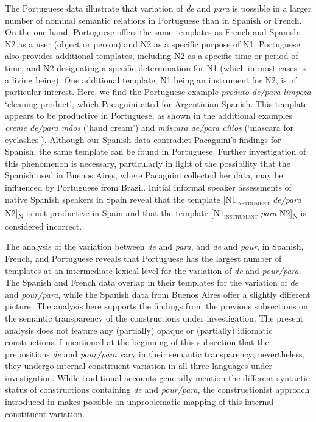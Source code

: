 \documentclass[output=paper]{langsci/langscibook}
\begin{document}
The Portuguese data illustrate that variation of \textit{de} and \textit{para} is possible in a larger number of nominal semantic relations in Portuguese than in Spanish or French. On the one hand, Portuguese offers the same templates as French and Spanish: N2 as a user (object or person) and N2 as a specific purpose of N1. Portuguese also provides additional templates, including N2 as a specific time or period of time, and N2 designating a specific determination for N1 (which in most cases is a living being). One additional template, N1 being an instrument for N2, is of particular interest. Here, we find the Portuguese example \textit{produto de/para limpeza} `cleaning product', which Pacagnini cited for Argentinian Spanish. This template appears to be productive in Portuguese, as shown in the additional examples \textit{creme de/para mãos} (`hand cream') and \textit{máscara de\slash para cílios} (`mascara for eyelashes'). Although our Spanish data contradict Pacagnini's findings for Spanish, the same template can be found in Portuguese. Further investigation of this phenomenon is necessary, particularly in light of the possibility that the Spanish used in Buenos Aires, where Pacagnini collected her data, may be influenced by Portuguese from Brazil. Initial informal speaker assessments of native Spanish speakers in Spain reveal that the template [N1\textsubscript{\scshape instrument} \textit{de/para} N2]\textsubscript{N} is not productive in Spain and that the template [N1\textsubscript{\scshape instrument} \textit{para} N2]\textsubscript{N} is considered incorrect. 

The analysis of the variation between \textit{de} and \textit{para}, and \textit{de} and \textit{pour}, in Spanish, French, and Portuguese reveals that Portuguese has the largest number of templates at an intermediate lexical level for the variation of \textit{de} and \textit{pour/para}. The Spanish and French data overlap in their templates for the variation of \textit{de} and \textit{pour/para}, while the Spanish data from Buenos Aires \citep{Pacagnini:2003} offer a slightly different picture. The analysis here supports the findings from the previous subsections on the semantic transparency of the constructions under investigation. The present analysis does not feature any (partially) opaque or (partially) idiomatic constructions.
I mentioned at the beginning of this subsection that the prepositions \textit{de} and \textit{pour/para} vary in their semantic transparency; nevertheless, they undergo internal constituent variation in all three languages under investigation. While traditional accounts generally mention the different syntactic status of constructions containing \textit{de} and \textit{pour/para}, the constructionist approach introduced in  makes possible an unproblematic mapping of this internal constituent variation.  
\end{document}
